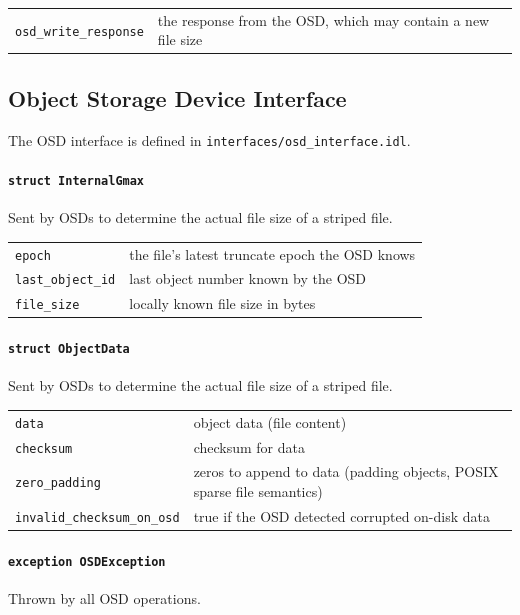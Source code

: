\begin{tabularx}{\textwidth}{lX}
 \texttt{osd\_write\_response} & the response from the OSD\index{OSD}, which may contain a new file size\\
\end{tabularx}



\subsection{Object Storage Device Interface}

The OSD interface is defined in \texttt{interfaces/osd\_interface.idl}.

\paragraph{\texttt{struct InternalGmax}}
Sent by OSDs to determine the actual file size of a striped file.

\begin{tabularx}{\textwidth}{lX}
 \texttt{epoch} & the file's latest truncate epoch the OSD\index{OSD} knows\\
 \texttt{last\_object\_id} & last object number known by the OSD\index{OSD}\\
 \texttt{file\_size} & locally known file size in bytes\\
\end{tabularx}


\paragraph{\texttt{struct ObjectData}}
Sent by OSDs to determine the actual file size of a striped file.

\begin{tabularx}{\textwidth}{lX}
 \texttt{data} & object data (file content)\\
 \texttt{checksum} & checksum for data\\
 \texttt{zero\_padding} & zeros to append to data (padding objects, POSIX\index{POSIX} sparse file semantics)\\
 \texttt{invalid\_checksum\_on\_osd} & true if the OSD\index{OSD} detected corrupted on-disk data\\
\end{tabularx}


\paragraph{\texttt{exception OSDException}}
Thrown by all OSD operations.

